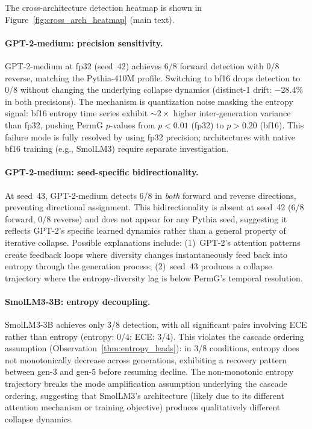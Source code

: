 The cross-architecture detection heatmap is shown in Figure~\ref{fig:cross_arch_heatmap} (main text).

\paragraph{GPT-2-medium: precision sensitivity.}
GPT-2-medium at fp32 (seed~42) achieves 6/8 forward detection with 0/8 reverse, matching the Pythia-410M profile.
Switching to bf16 drops detection to 0/8 without changing the underlying collapse dynamics (distinct-1 drift: $-28.4\%$ in both precisions).
The mechanism is quantization noise masking the entropy signal: bf16 entropy time series exhibit ${\sim}2{\times}$ higher inter-generation variance than fp32, pushing PermG $p$-values from $p{<}0.01$ (fp32) to $p{>}0.20$ (bf16).
This failure mode is fully resolved by using fp32 precision; architectures with native bf16 training (e.g., SmolLM3) require separate investigation.

\paragraph{GPT-2-medium: seed-specific bidirectionality.}
At seed~43, GPT-2-medium detects 6/8 in \emph{both} forward and reverse directions, preventing directional assignment.
This bidirectionality is absent at seed~42 (6/8 forward, 0/8 reverse) and does not appear for any Pythia seed, suggesting it reflects GPT-2's specific learned dynamics rather than a general property of iterative collapse.
Possible explanations include: (1)~GPT-2's attention patterns create feedback loops where diversity changes instantaneously feed back into entropy through the generation process; (2)~seed~43 produces a collapse trajectory where the entropy-diversity lag is below PermG's temporal resolution.

\paragraph{SmolLM3-3B: entropy decoupling.}
SmolLM3-3B achieves only 3/8 detection, with all significant pairs involving ECE rather than entropy (entropy: 0/4; ECE: 3/4).
This violates the cascade ordering assumption (Observation~\ref{thm:entropy_leads}): in 3/8 conditions, entropy does not monotonically decrease across generations, exhibiting a recovery pattern between gen-3 and gen-5 before resuming decline.
The non-monotonic entropy trajectory breaks the mode amplification assumption underlying the cascade ordering, suggesting that SmolLM3's architecture (likely due to its different attention mechanism or training objective) produces qualitatively different collapse dynamics.

